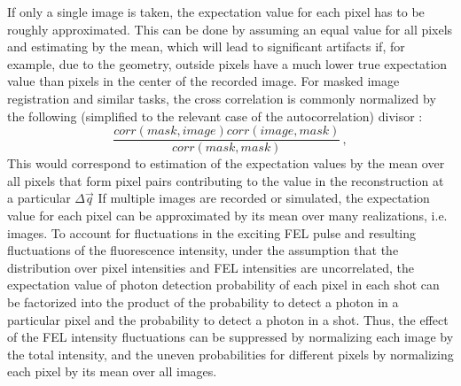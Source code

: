 If only a single image is taken, the expectation value for each pixel has to be roughly approximated. This can be done by assuming an equal value for all pixels and estimating by the mean, which will lead to significant artifacts if, for example, due to the geometry, outside pixels have a much lower true expectation value than pixels in the center of the recorded image.  
For masked image registration and similar tasks, the cross correlation is commonly normalized by the following (simplified to the relevant case of the autocorrelation) divisor \cite{padfield2010}:
\begin{equation}
	\frac{\mathit{corr}(\mathit{mask},\mathit{image}) \mathit{corr}(\mathit{image},\mathit{mask})}{\mathit{corr}(\mathit{mask},\mathit{mask})} \,,
	\label{eq:normshot}
\end{equation} This would correspond to estimation of the expectation values by the mean over all pixels that form pixel pairs contributing to the value in the reconstruction at a particular $\Delta \vec{q}$
If multiple images are recorded or simulated, the expectation value for each pixel can be approximated by its mean over many realizations, i.e. images. To account for fluctuations in the exciting FEL pulse and resulting fluctuations of the fluorescence intensity, under the assumption that the distribution over pixel intensities and FEL intensities are uncorrelated, the expectation value of photon detection probability of each pixel in each shot can be factorized into the product of the probability to detect a photon in a particular pixel and the probability to detect a photon in a shot. Thus, the effect of the FEL intensity fluctuations can be suppressed by normalizing each image by the total intensity, and the uneven probabilities for different pixels by normalizing each pixel by its mean over all images. 



\clearpage
